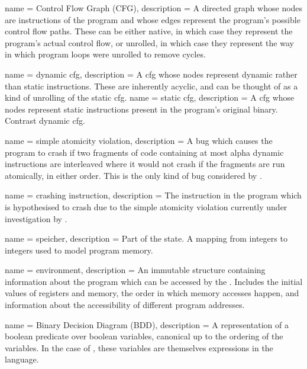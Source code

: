 {
  name = Control Flow Graph (CFG),
  description = {A directed graph whose nodes are instructions
    of the program and whose edges represent the program's possible
    control flow paths.  These can be either native, in which
    case they represent the program's actual control flow, or
    unrolled, in which case they represent the way in which program
    loops were unrolled to remove cycles.
  }
}

{
  name = {dynamic \gls{cfg}},
  description = {A \gls{cfg} whose nodes represent dynamic rather than
    static instructions.  These are inherently acyclic, and can be thought
    of as a kind of unrolling of the \gls{static cfg}.}
}
{
  name = {static \gls{cfg}},
  description = {A \gls{cfg} whose nodes represent static instructions
    present in the program's original binary.  Contrast \gls{dynamic cfg}.}
}

{
  name = {simple atomicity violation},
  description = {A bug which causes the program to crash if two fragments of
    code containing at most \gls{alpha} dynamic instructions are interleaved where
    it would not crash if the fragments are run atomically, in either order.
    This is the only kind of bug considered by {\technique}.}
}

{
  name = {crashing instruction},
  description = {The instruction in the program which is hypothesised to crash
    due to the \gls{simple atomicity violation} currently under investigation by
    {\technique}.}
}

 { name = {speicher}, description = {Part
    of the {\StateMachine} state.  A mapping from integers to integers
    used to model program memory.} }

 { name = {environment}, description =
  {An immutable structure containing information about the program
    which can be accessed by the {\StateMachine}.  Includes the
    initial values of registers and memory, the order in which memory
    accesses happen, and information about the accessibility of
    different program addresses. }}

{
  name = Binary Decision Diagram (BDD),
  description = {A representation of a boolean predicate over boolean
    variables, canonical up to the ordering of the variables.  In the
    case of {\technique}, these variables are themselves expressions in
    the {\StateMachine} language.}
}

